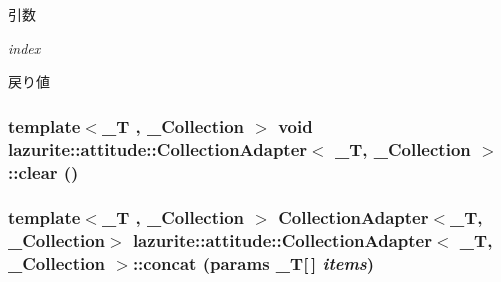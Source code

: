 \begin{DoxyParams}{引数}
\item[{\em index}]\end{DoxyParams}
\begin{DoxyReturn}{戻り値}

\end{DoxyReturn}
\hypertarget{classlazurite_1_1attitude_1_1_collection_adapter_3_01___t_00_01___collection_01_4_af9174ebfebc8d4a3a01124a588ec63d7}{
\subsubsection[{clear}]{\setlength{\rightskip}{0pt plus 5cm}template$<$\_\-T , \_\-Collection $>$ void lazurite::attitude::CollectionAdapter$<$ \_\-T, \_\-Collection $>$::clear ()}}
\label{classlazurite_1_1attitude_1_1_collection_adapter_3_01___t_00_01___collection_01_4_af9174ebfebc8d4a3a01124a588ec63d7}
\hypertarget{classlazurite_1_1attitude_1_1_collection_adapter_3_01___t_00_01___collection_01_4_a98365702ff0b4a0a3a794854e3141ba4}{
\subsubsection[{concat}]{\setlength{\rightskip}{0pt plus 5cm}template$<$\_\-T , \_\-Collection $>$ CollectionAdapter$<$\_\-T, \_\-Collection$>$ lazurite::attitude::CollectionAdapter$<$ \_\-T, \_\-Collection $>$::concat (params \_\-T\mbox{[}$\,$\mbox{]} {\em items})}}
\label{classlazurite_1_1attitude_1_1_collection_adapter_3_01___t_00_01___collection_01_4_a98365702ff0b4a0a3a794854e3141ba4}

